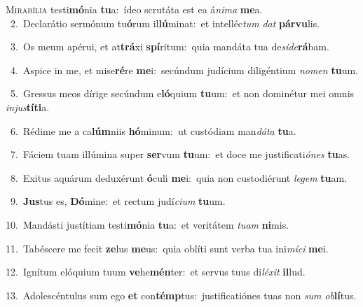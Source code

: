 \lettrine{\initial\textcolor{\initialcolor}{M}}{irabília} testi\-\textbf{mó}\-nia \textbf{tu}\-a:~\star ídeo scrutáta est ea á\-\textit{ni}\-\textit{ma} \textbf{me}\-a.\\
{\numbfont\textcolor{\numbcolor}{~2.}}~Declarátio sermónum tu\-\textbf{ó}\-rum il\-\textbf{lú}\-minat:~\star et intelléc\textit{tum} \textit{dat} \textbf{pár}\-\textbf{vu}lis.\par
{\numbfont\textcolor{\numbcolor}{~3.}}~Os meum apérui, et at\-\textbf{trá}\-xi \textbf{spí}\-ritum:~\star quia mandáta tua de\-\textit{si}\-\textit{de}\textbf{rá}bam.\par
{\numbfont\textcolor{\numbcolor}{~4.}}~Aspice in me, et mise\-\textbf{ré}\-re \textbf{me}\-i:~\star secúndum judícium diligéntium \textit{no}\-\textit{men} \textbf{tu}\-um.\par
{\numbfont\textcolor{\numbcolor}{~5.}}~Gressus meos dírige secúndum e\-\textbf{ló}\-quium \textbf{tu}\-um:~\star et non dominétur mei omnis \textit{in}\-\textit{jus}\textbf{tí}\textbf{ti}a.\par
{\numbfont\textcolor{\numbcolor}{~6.}}~Rédime me a ca\-\textbf{lúm}\-niis \textbf{hó}\-minum:~\star ut custódiam man\-\textit{dá}\-\textit{ta} \textbf{tu}\-a.\par
{\numbfont\textcolor{\numbcolor}{~7.}}~Fáciem tuam illúmina super \textbf{ser}\-vum \textbf{tu}\-um:~\star et doce me justificati\-\textit{ó}\-\textit{nes} \textbf{tu}\-as.\par
{\numbfont\textcolor{\numbcolor}{~8.}}~Exitus aquárum deduxérunt \textbf{ó}\-culi \textbf{me}\-i:~\star quia non custodiérunt \textit{le}\-\textit{gem} \textbf{tu}\-am.\par
{\numbfont\textcolor{\numbcolor}{~9.}}~\-\textbf{Jus}\-tus es, \textbf{Dó}\-mine:~\star et rectum judí\-\textit{ci}\-\textit{um} \textbf{tu}\-um.\par
{\numbfont\textcolor{\numbcolor}{10.}}~Mandásti justítiam testi\-\textbf{mó}\-nia \textbf{tu}\-a:~\star et veritátem \textit{tu}\-\textit{am} \textbf{ni}\-mis.\par
{\numbfont\textcolor{\numbcolor}{11.}}~Tabéscere me fecit \textbf{ze}\-lus \textbf{me}\-us:~\star quia oblíti sunt verba tua ini\-\textit{mí}\-\textit{ci} \textbf{me}\-i.\par
{\numbfont\textcolor{\numbcolor}{12.}}~Ignítum elóquium tuum \textbf{ve}\-he\-\textbf{mén}\-ter:~\star et servus tuus di\-\textit{lé}\-\textit{xit} \textbf{il}\-lud.\par
{\numbfont\textcolor{\numbcolor}{13.}}~Adolescéntulus sum ego \textbf{et} con\-\textbf{témp}\-tus:~\star justificatiónes tuas non \textit{sum} \textit{ob}\-\textbf{lí}tus.\par

